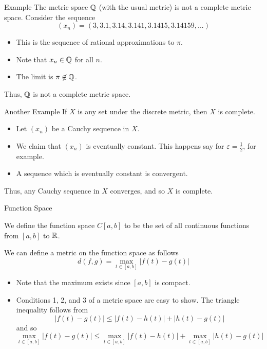 \documentclass[10pt]{beamer}
\begin{document}
    \begin{frame}{Example}
        The metric space $\mathbb{Q}$ (with the usual metric) is not a complete metric space. Consider the sequence 
        \begin{equation*}
            (x_n) = (3, 3.1, 3.14, 3.141, 3.1415, 3.14159, ...)
        \end{equation*}
        \begin{itemize}
            \item This is the sequence of rational approximations to $\pi$. 
            \item Note that $x_n\in \mathbb{Q}$ for all $n$. 
            \item The limit is $\pi\not\in \mathbb{Q}$. 
        \end{itemize}
        Thus, $\mathbb{Q}$ is not a complete metric space.
    \end{frame}

    \begin{frame}{Another Example}
        If $X$ is any set under the discrete metric, then $X$ is complete. 
        \begin{itemize}
            \item Let $(x_n)$ be a Cauchy sequence in $X$. 
            \item We claim that $(x_n)$ is eventually constant. This happens say for $\varepsilon = \frac{1}{2}$, for example. 
            \item A sequence which is eventually constant is convergent. 
        \end{itemize}
        Thus, any Cauchy sequence in $X$ converges, and so $X$ is complete.
    \end{frame}

		\begin{frame}{Function Space}
				\begin{definition}
						We define the \alert{function space} $C[a,b]$ to be the set of all continuous functions from $[a,b]$ to $\mathbb{R}$. 
				\end{definition}
				We can define a metric on the function space as follows
				\begin{equation*}
						d(f, g) = \max_{t\in [a,b]} |f(t) - g(t)|
				\end{equation*}
				\begin{itemize}
						\item Note that the maximum exists since $[a,b]$ is compact. 
						\item Conditions 1, 2, and 3 of a metric space are easy to show. The triangle inequality follows from 
								\begin{equation*}
										|f(t) - g(t)| \leq |f(t) - h(t)| + |h(t) - g(t)|
								\end{equation*}
								and so 
								\begin{equation*}
										\max_{t\in [a,b]} |f(t) - g(t)| \leq \max_{t\in [a,b]} |f(t) - h(t)| + \max_{t\in [a,b]} |h(t) - g(t)|
								\end{equation*}
				\end{itemize}
		\end{frame}	
    
\end{document}
